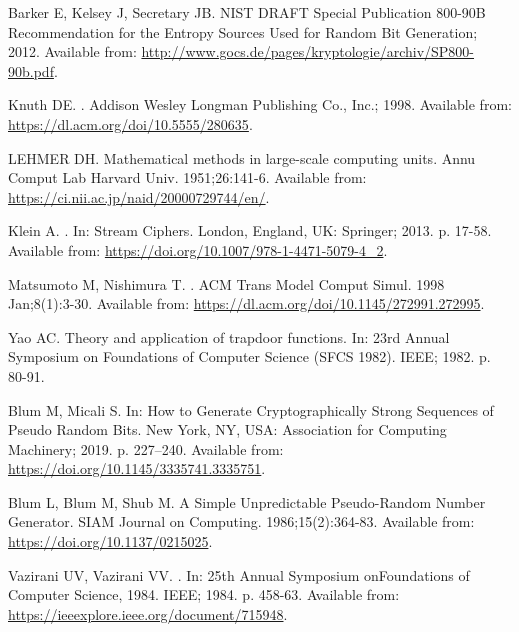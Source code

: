 \documentclass[]{interact}
\theoremstyle{plain}%
\theoremstyle{definition}
\theoremstyle{remark}
\begin{document}
\begin{thebibliography}{100}
Barker E, Kelsey J, Secretary JB. NIST DRAFT Special Publication 800-90B
  Recommendation for the Entropy Sources Used for Random Bit Generation; 2012.
\newblock Available from:
  \url{http://www.gocs.de/pages/kryptologie/archiv/SP800-90b.pdf}.

Knuth DE.
.
\newblock Addison Wesley Longman Publishing Co., Inc.; 1998.
\newblock Available from: \url{https://dl.acm.org/doi/10.5555/280635}.

LEHMER DH.
\newblock Mathematical methods in large-scale computing units.
\newblock Annu Comput Lab Harvard Univ. 1951;26:141-6.
\newblock Available from: \url{https://ci.nii.ac.jp/naid/20000729744/en/}.

Klein A.
.
\newblock In: {Stream Ciphers}. London, England, UK: Springer; 2013. p. 17-58.
\newblock Available from: \url{https://doi.org/10.1007/978-1-4471-5079-4_2}.

Matsumoto M, Nishimura T.
.
\newblock ACM Trans Model Comput Simul. 1998 Jan;8(1):3-30.
\newblock Available from: \url{https://dl.acm.org/doi/10.1145/272991.272995}.

Yao AC.
\newblock Theory and application of trapdoor functions.
\newblock In: 23rd Annual Symposium on Foundations of Computer Science (SFCS
  1982). IEEE; 1982. p. 80-91.

Blum M, Micali S.
\newblock In: How to Generate Cryptographically Strong Sequences of Pseudo
  Random Bits. New York, NY, USA: Association for Computing Machinery; 2019. p.
  227–240.
\newblock Available from: \url{https://doi.org/10.1145/3335741.3335751}.

Blum L, Blum M, Shub M.
\newblock A Simple Unpredictable Pseudo-Random Number Generator.
\newblock SIAM Journal on Computing. 1986;15(2):364-83.
\newblock Available from: \url{https://doi.org/10.1137/0215025}.

Vazirani UV, Vazirani VV.
.
\newblock In: {25th Annual Symposium onFoundations of Computer Science, 1984.}
  IEEE; 1984. p. 458-63.
\newblock Available from: \url{https://ieeexplore.ieee.org/document/715948}.


\end{thebibliography}
\end{document}
